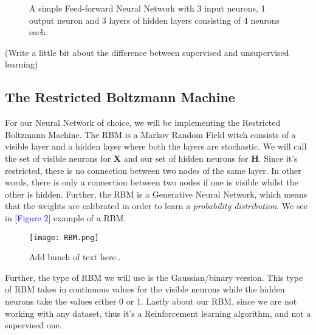 \begin{figure}[htbp]
  \centering
  
  \caption{A simple Feed-forward Neural Network with 3 input neurons, 1 output neuron and 3 layers of hidden layers consisting of 4 neurons each.}
\end{figure}

(Write a little bit about the difference between supervised and unsupervised learning)

\subsection{The Restricted Boltzmann Machine}
For our Neural Network of choice, we will be implementing the Restricted Boltzmann Machine. The RBM is a Markov Random Field witch consists of a visible layer and a hidden layer where both the layers are stochastic. We will call the set of visible neurons for $\mathbf{X}$ and our set of hidden neurons for $\mathbf{H}$. Since it's restricted, there is no connection between two nodes of the same layer. In other words, there is only a connection between two nodes if one is visible whilst the other is hidden. Further, the RBM is a Generative Neural Network, which means that the weights are calibrated in order to learn a \textit{probability distribution}. We see in [\textcolor{blue}{Figure 2}] example of a RBM. 

\newpage
\begin{figure}[h!]
  \centering
  \texttt{[image: RBM.png]}
  \caption{Add bunch of text here..}
\end{figure}

Further, the type of RBM we will use is the Gaussian/binary version. This type of RBM takes in continuous values for the visible neurons while the hidden neurons take the values either $0$ or $1$. Lastly about our RBM, since we are not working with any dataset, thus it's a Reinforcement learning algorithm, and not a supervised one. \\\\

